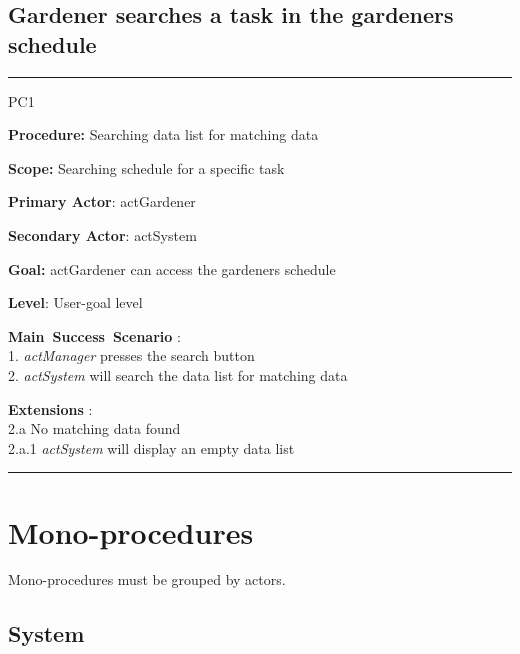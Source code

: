 \break

\subsection{Gardener searches a task in the gardeners schedule}
\vspace{0.5cm}
\hrule
\hfill \break
\begin{lyxlist}{PC1}
\small{
\item [\textbf{Procedure:}] Searching data list for matching data
\item [\textbf{Scope:}] Searching schedule for a specific task
\item [\textbf{Primary Actor}:] actGardener
\item [\textbf{Secondary Actor}:] actSystem
\item [\textbf{Goal:}] actGardener can access the gardeners schedule
\item [\textbf{Level}:] User-goal level
\item [\textbf{Main~Success~Scenario}]:\\
1. \emph{actManager} presses the search button\\
2. \emph{actSystem} will search the data list for matching data\\
\item [\textbf{Extensions}]:\\
2.a No matching data found\\
\hspace*{0.5cm} 2.a.1 \emph{actSystem} will display an empty data list}
\end{lyxlist}
\hrule
\vspace{0.5cm}



\break



\section{Mono-procedures}
Mono-procedures must be grouped by actors.


\subsection{System}

